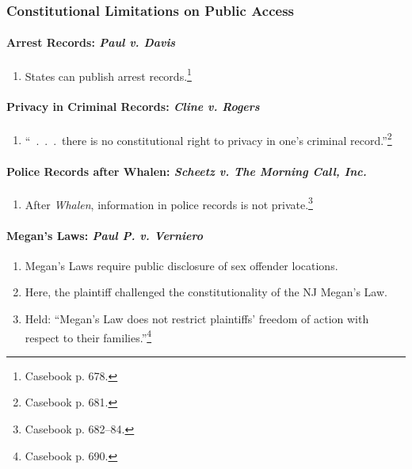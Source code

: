 \subsubsection{Constitutional Limitations on Public Access}

\paragraph{Arrest Records: \emph{Paul v. Davis}}

\begin{enumerate}
    \item States can publish arrest records.\footnote{Casebook p. 678.}
\end{enumerate}

\paragraph{Privacy in Criminal Records: \emph{Cline v. Rogers}}

\begin{enumerate}
    \item ``~.~.~.~there is no constitutional right to privacy in one's 
    criminal record.''\footnote{Casebook p. 681.}
\end{enumerate}

\paragraph{Police Records after Whalen: \emph{Scheetz v. The Morning Call, Inc.}}

\begin{enumerate}
    \item After \emph{Whalen}, information in police records is not 
    private.\footnote{Casebook p. 682--84.}
\end{enumerate}

\paragraph{Megan's Laws: \emph{Paul P. v. Verniero}} %

\begin{enumerate}
    \item Megan's Laws require public disclosure of sex offender locations.
    \item Here, the plaintiff challenged the constitutionality of the NJ 
    Megan's Law.
    \item Held: ``Megan's Law does not restrict plaintiffs' freedom of action 
    with respect to their families.''\footnote{Casebook p. 690.}
\end{enumerate}

